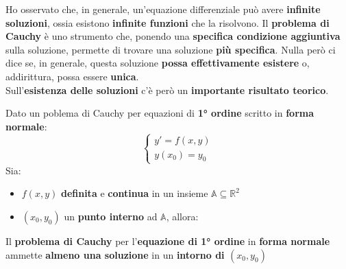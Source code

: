 \documentclass[a4paper, oneside]{article}
\newcommand\R{\mathbb{R}}
\newcommand\A{\mathbb{A}}
\begin{document}
    \newpage
    \noindent Ho osservato che, in generale, un'equazione differenziale può avere \textbf{infinite soluzioni}, ossia esistono \textbf{infinite funzioni}
    che la risolvono. Il \textbf{problema di Cauchy} è uno strumento che, ponendo una \textbf{specifica condizione aggiuntiva} sulla soluzione,
    permette di trovare una soluzione \textbf{più specifica}. Nulla però ci dice se, in generale, questa soluzione \textbf{possa effettivamente 
    esistere} o, addirittura, possa essere \textbf{unica}. \\
    Sull'\textbf{esistenza delle soluzioni} c'è però un \textbf{importante risultato teorico}. 



    \begin{theorem}
        Dato un poblema di Cauchy per equazioni di \textbf{1° ordine} scritto in \textbf{forma normale}:
        \[\begin{cases}
            y'=f(x,y) \\
            y(x_0)=y_0
        \end{cases}\]
        Sia:
        \begin{itemize}
            \item $f(x,y)$ \textbf{definita} e \textbf{continua} in un insieme $\A\subseteq \R^2$
            \item $(x_0,y_0)$ un \textbf{punto interno} ad $\A$, allora:
        \end{itemize}

        Il \textbf{problema di Cauchy} per l'\textbf{equazione di 1° ordine} in \textbf{forma normale} ammette 
        \textbf{almeno una soluzione} in un \textbf{intorno di $(x_0,y_0)$}
    \end{theorem}
\end{document}
